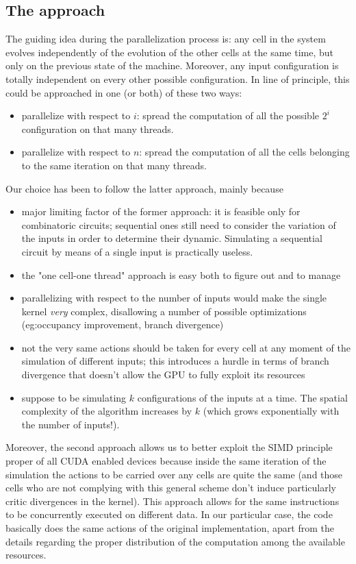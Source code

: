 \subsection{The approach}
The guiding idea during the parallelization process is: any cell in the system evolves independently of the evolution of the other cells at the same time, but only on the previous state of the machine. Moreover, any input configuration is totally independent on every other possible configuration. In line of principle, this could be approached in one (or both) of these two ways:
\begin{itemize}
\item parallelize with respect to $i$: spread the computation of all the possible $2^i$ configuration on that many threads.
\item parallelize with respect to $n$: spread the computation of all the cells belonging to the same iteration on that many threads.
\end{itemize}
Our choice has been to follow the latter approach, mainly because 
\begin{itemize}
\item major limiting factor of the former approach: it is feasible only for combinatoric circuits; sequential ones still need to consider the variation of the inputs in order to determine their dynamic. Simulating a sequential circuit by means of a single input is practically useless.
\item the "one cell-one thread" approach is easy both to figure out and to manage
\item parallelizing with respect to the number of inputs would make the single kernel \textsl{very} complex, disallowing a number of possible optimizations (eg:occupancy improvement, branch divergence)  
\item not the very same actions should be taken for every cell at any moment of the simulation of different inputs; this introduces a hurdle in terms of branch divergence that doesn't allow the GPU to fully exploit its resources
\item suppose to be simulating $k$ configurations of the inputs at a time. The spatial complexity of the algorithm increases by $k$ (which grows exponentially with the number of inputs!).
\end{itemize} 

Moreover, the second approach allows us to better exploit the SIMD principle proper of all CUDA enabled devices because inside the same iteration of the simulation the actions to be carried over any cells are quite the same (and those cells who are not complying with this general scheme don't induce particularly critic divergences in the kernel). This approach allows for the same instructions to be concurrently executed on different data. In our particular case, the code basically does the same actions of the original implementation, apart from the details regarding the proper distribution of the computation among the available resources.

